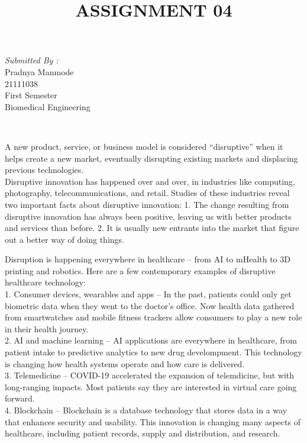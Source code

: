\documentclass[12pt]{article}
\begin{document}
\begin{titlepage}
\begin{minipage}{0.4\textwidth}
			\begin{flushright} \large
			\emph{Submitted By :} \\
			Pradnya Manmode\\
            21111038\\
        First Semester\\
        Biomedical Engineering\\
		\end{flushright}
        
	\end{minipage}\\[2 cm]
	
	
    
    
    
    
	
\end{titlepage}


\title{ASSIGNMENT 04}
\maketitle

\indent
A new product, service, or business model is considered “disruptive” when it helps create a new market, eventually disrupting existing markets and displacing previous technologies.
\\
Disruptive innovation has happened over and over, in industries like computing, photography, telecommunications, and retail. Studies of these industries reveal two important facts about disruptive innovation:
1. The change resulting from disruptive innovation has always been positive, leaving us with better products and services than before.
2. It is usually new entrants into the market that figure out a better way of doing things.

\indent
Disruption is happening everywhere in healthcare – from AI to mHealth to 3D printing and robotics. Here are a few contemporary examples of disruptive healthcare technology:
\\
1. Consumer devices, wearables and apps – In the past, patients could only get biometric data when they went to the doctor’s office. Now health data gathered from smartwatches and mobile fitness trackers allow consumers to play a new role in their health journey.
\\
2. AI and machine learning – AI applications are everywhere in healthcare, from patient intake to predictive analytics to new drug develompment. This technology is changing how health systems operate and how care is delivered.\\
3. Telemedicine – COVID-19 accelerated the expansion of telemdicine, but with long-ranging impacts. Most patients say they are interested in virtual care going forward.\\
4. Blockchain – Blockchain is a database technology that stores data in a way that enhances security and usability. This innovation is changing many aspects of healthcare, including patient records, supply and distribution, and research.
\end{document}
